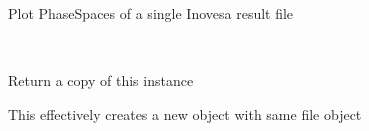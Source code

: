 \documentclass[letterpaper,10pt,openany,oneside,english]{sphinxmanual}
\begin{document}
\begin{fulllineitems}
\label{\detokenize{plots:plots.PhaseSpace}}
Plot PhaseSpaces of a single Inovesa result file

\begin{fulllineitems}
\label{\detokenize{plots:plots.PhaseSpace.__init__}}
\end{fulllineitems}


\begin{fulllineitems}
\label{\detokenize{plots:plots.PhaseSpace.eax}}
\end{fulllineitems}


\begin{fulllineitems}
\label{\detokenize{plots:plots.PhaseSpace.xax}}
\end{fulllineitems}


\begin{fulllineitems}
\label{\detokenize{plots:plots.PhaseSpace.ps_data}}
\end{fulllineitems}


\begin{fulllineitems}
\label{\detokenize{plots:plots.PhaseSpace.clone}}~
\begin{DUlineblock}{0em}
\item[] Return a copy of this instance  
\item[] This effectively creates a new object with same file object  
\end{DUlineblock}

\end{fulllineitems}



\end{fulllineitems}
\end{document}
